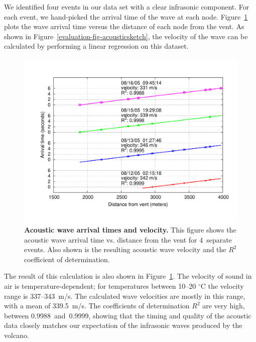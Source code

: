 We identified four events in our data set with a clear infrasonic component.
For each event, we hand-picked the arrival time of the wave at each node.
Figure~\ref{evaluation-fig-acousticarrival} plots the wave arrival time
versus the distance of each node from the vent. As shown in
Figure~\ref{evaluation-fig-acousticsketch}, the velocity of the wave can be
calculated by performing a linear regression on this dataset.

\begin{figure}[t]
\begin{center}
\includegraphics[width=\hsize]{./3-evaluation/figs/acousticarrival.pdf}
\end{center}

\caption{\textbf{Acoustic wave arrival times and velocity.} This figure shows
the acoustic wave arrival time vs. distance from the vent for 4~separate
events. Also shown is the resulting acoustic wave velocity and the $R^2$
coefficient of determination.}

\label{evaluation-fig-acousticarrival}
\end{figure}

The result of this calculation is also shown in
Figure~\ref{evaluation-fig-acousticarrival}. The velocity of sound in air is
temperature-dependent; for temperatures between 10--20 $^{\circ}$C the
velocity range is 337--343~m/s. The calculated wave velocities are mostly in
this range, with a mean of 339.5~m/s. The coefficients of determination $R^2$
are very high, between 0.9988~and~0.9999, showing that the timing and quality
of the acoustic data closely matches our expectation of the infrasonic waves
produced by the volcano.

